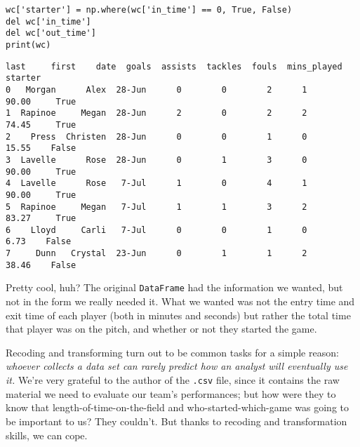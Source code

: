 \begin{samepage}
\begin{Verbatim}[fontsize=\small,samepage=true,frame=single,framesep=3mm]
wc['starter'] = np.where(wc['in_time'] == 0, True, False)
del wc['in_time']
del wc['out_time']
print(wc)
\end{Verbatim}
\vspace{-.2in}

\begin{Verbatim}[fontsize=\scriptsize,samepage=true,frame=leftline,framesep=5mm,framerule=1mm]
      last     first    date  goals  assists  tackles  fouls  mins_played  starter
0   Morgan      Alex  28-Jun      0        0        2      1        90.00     True
1  Rapinoe     Megan  28-Jun      2        0        2      2        74.45     True
2    Press  Christen  28-Jun      0        0        1      0        15.55    False
3  Lavelle      Rose  28-Jun      0        1        3      0        90.00     True
4  Lavelle      Rose   7-Jul      1        0        4      1        90.00     True
5  Rapinoe     Megan   7-Jul      1        1        3      2        83.27     True
6    Lloyd     Carli   7-Jul      0        0        1      0         6.73    False
7     Dunn   Crystal  23-Jun      0        1        1      2        38.46    False
\end{Verbatim}
\end{samepage}

Pretty cool, huh? The original \texttt{DataFrame} had the information we
wanted, but not in the form we really needed it. What we wanted was not the
entry time and exit time of each player (both in minutes and seconds) but
rather the total time that player was on the pitch, and whether or not they
started the game.

Recoding and transforming turn out to be common tasks for a simple reason:
\textit{whoever collects a data set can rarely predict how an analyst will
eventually use it.} We're very grateful to the author of the \texttt{.csv}
file, since it contains the raw material we need to evaluate our team's
performances; but how were they to know that length-of-time-on-the-field and
who-started-which-game was going to be important to us? They couldn't. But
thanks to recoding and transformation skills, we can cope.

